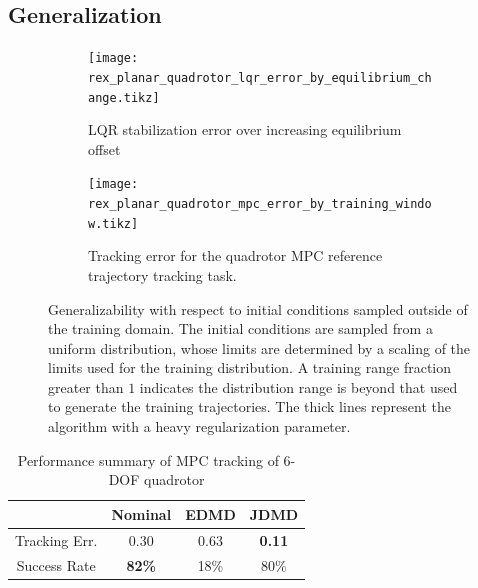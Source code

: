 \documentclass{article}
\begin{document}
\subsection{Generalization}
\begin{figure}[t] \centering
  \begin{subfigure}[t]{0.49\textwidth}
    \centering
    \texttt{[image: rex\_planar\_quadrotor\_lqr\_error\_by\_equilibrium\_change.tikz]}
    \caption{LQR stabilization error over increasing equilibrium offset}
    \label{fig:rex_planar_quadrotor_lqr_error_by_equilibrium_change}
  \end{subfigure}
  \hfill
  \begin{subfigure}[t]{0.48\textwidth}
    \raggedright
    \texttt{[image: rex\_planar\_quadrotor\_mpc\_error\_by\_training\_window.tikz]}
    \caption{Tracking error for the quadrotor MPC reference trajectory tracking task.}
    \label{fig:rex_planar_quadrotor_mpc_error_by_training_window}
  \end{subfigure}
  \caption{Generalizability with respect to initial conditions sampled outside of the 
  training domain. The initial conditions are sampled from a uniform distribution, whose 
  limits are determined by a scaling of the limits used for the training distribution. 
  A training range fraction greater than $1$ indicates the
  distribution range is beyond that used to generate the training trajectories. The thick 
  lines represent the algorithm with a heavy regularization parameter.
  }
  \label{fig:training_window}
\end{figure}
\begin{table}
	\vspace{-2\baselineskip}
	\begin{tabular}{cccc}\\
		\toprule  
								& {\color{black} \textbf{Nominal}} & {\color{orange} \textbf{EDMD}} & {\textbf{\color{cyan} JDMD}} \\
		\midrule
		Tracking Err.		& 0.30			& 0.63 	& \textbf{0.11} \\
		Success Rate 			& \textbf{82\%} & 18\%	& 80\% \\
		\bottomrule
	\end{tabular}
	\caption{Performance summary of MPC tracking of 6-DOF quadrotor}
	\vspace{-1\baselineskip}
	\label{tab:full_quad_tracking_mpc}
\end{table} 
\end{document}
